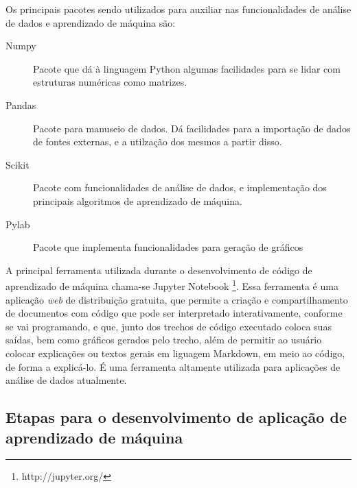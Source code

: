 			Os principais pacotes sendo utilizados para auxiliar nas funcionalidades de análise de dados e aprendizado de máquina são:

			\begin{description}
				\item [Numpy] Pacote que dá à linguagem Python algumas facilidades para se lidar com estruturas numéricas como matrizes.
				\item [Pandas] Pacote para manuseio de dados. Dá facilidades para a importação de dados de fontes externas, e a utilzação dos mesmos a partir disso.
				\item [Scikit] Pacote com funcionalidades de análise de dados, e implementação dos principais algoritmos de aprendizado de máquina.
				\item [Pylab] Pacote que implementa funcionalidades para geração de gráficos
			\end{description}

			A principal ferramenta utilizada durante o desenvolvimento de código de aprendizado de máquina chama-se Jupyter Notebook \footnote{http://jupyter.org/}. Essa ferramenta é uma aplicação \emph{web} de distribuição gratuita, que permite a criação e compartilhamento de documentos com código que pode ser interpretado interativamente, conforme se vai programando, e que, junto dos trechos de código executado coloca suas saídas, bem como gráficos gerados pelo trecho, além de permitir ao usuário colocar explicações ou textos gerais em liguagem Markdown, em meio ao código, de forma a explicá-lo. É uma ferramenta altamente utilizada para aplicações de análise de dados atualmente.

		\subsection{Etapas para o desenvolvimento de aplicação de aprendizado de máquina}


